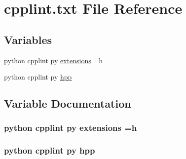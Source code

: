 \hypertarget{cpplint_8txt}{}\section{cpplint.\+txt File Reference}
\label{cpplint_8txt}
\subsection*{Variables}
\begin{DoxyCompactItemize}
\item 
python cpplint py \hyperlink{cpplint_8txt_a0dc02cd6e12520977ff461327b1ce31d}{extensions} =h
\item 
python cpplint py \hyperlink{cpplint_8txt_a569be115f8aa1ecf357c9fe7920b6f9d}{hpp}
\end{DoxyCompactItemize}


\subsection{Variable Documentation}
\subsubsection[{\texorpdfstring{extensions}{extensions}}]{\setlength{\rightskip}{0pt plus 5cm}python cpplint py extensions =h}\hypertarget{cpplint_8txt_a0dc02cd6e12520977ff461327b1ce31d}{}\label{cpplint_8txt_a0dc02cd6e12520977ff461327b1ce31d}
\subsubsection[{\texorpdfstring{hpp}{hpp}}]{\setlength{\rightskip}{0pt plus 5cm}python cpplint py hpp}\hypertarget{cpplint_8txt_a569be115f8aa1ecf357c9fe7920b6f9d}{}\label{cpplint_8txt_a569be115f8aa1ecf357c9fe7920b6f9d}
